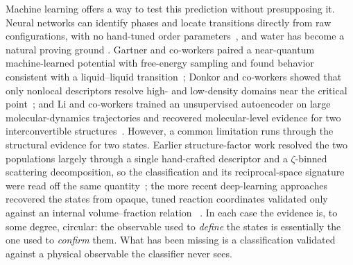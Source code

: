 Machine learning offers a way to test this prediction without presupposing it.  Neural networks can identify phases and locate transitions directly from raw configurations, with no hand-tuned order parameters~\cite{carrasquilla_machine_2017}, and water has become a natural proving ground . Gartner and co-workers paired a near-quantum machine-learned potential with free-energy sampling and found behavior consistent with a liquid--liquid transition~\cite{gartner_signatures_2020}; Donkor and co-workers showed that only nonlocal descriptors resolve high- and low-density domains near the critical point~\cite{donkor_beyond_2024}; and Li and co-workers trained an unsupervised autoencoder on large molecular-dynamics trajectories and recovered molecular-level evidence for two interconvertible structures~\cite{li_evidence_2026}.  However, a common limitation runs through the structural evidence for two states.  Earlier structure-factor work  resolved the two populations largely through a single hand-crafted descriptor and a $\zeta$-binned scattering decomposition, so the classification and its reciprocal-space signature were read off the same quantity~\cite{shi_direct_2020}; the more recent deep-learning approaches recovered the states from opaque, tuned reaction coordinates validated only against an internal volume--fraction relation~\cite{li_evidence_2026} . In each case the evidence is, to some degree,
circular: the observable used to \emph{define} the states is essentially the one used to \emph{confirm} them. What has been missing is a classification validated against a physical observable the classifier never sees. 

